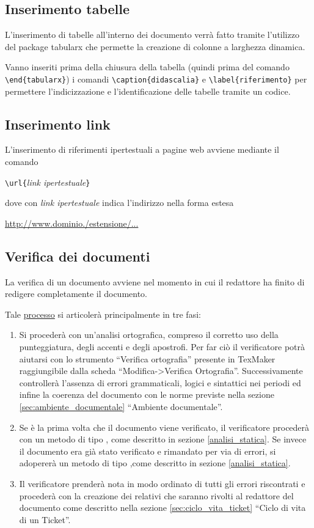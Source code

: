 \subsection{Inserimento tabelle}
L'inserimento di tabelle all'interno dei documento verrà fatto tramite l'utilizzo del package tabularx che permette la creazione di colonne a larghezza dinamica.

Vanno inseriti prima della chiusura della tabella (quindi prima del comando \verb+\end{tabularx}+) i comandi \verb+\caption{didascalia}+ e \verb+\label{riferimento}+ per permettere l'indicizzazione e l'identificazione delle tabelle tramite un codice.

\subsection{Inserimento link}
L'inserimento di riferimenti ipertestuali a pagine web avviene mediante il comando 
\begin{center}
\verb+\url{+\textit{link ipertestuale}\verb+}+
\end{center}
dove con \textit{link ipertestuale} indica l'indirizzo nella forma estesa 
\begin{center}
\url{http://www.dominio./estensione/...}
\end{center}


\subsection{Verifica dei documenti}
\label{sec:verifica_documenti}
La verifica di un documento avviene nel momento in cui il redattore ha finito di redigere completamente il documento.

Tale \underline{processo} si articolerà principalmente in tre fasi:
\begin{enumerate}
\item Si procederà con un'analisi ortografica, compreso il corretto uso della punteggiatura, degli accenti e degli apostrofi. Per far ciò il verificatore potrà aiutarsi con lo strumento ``Verifica ortografia'' presente in TexMaker raggiungibile dalla scheda ``Modifica->Verifica Ortografia''. Successivamente controllerà l'assenza di errori grammaticali, logici e sintattici nei periodi ed infine la coerenza del documento con le norme previste nella sezione \ref{sec:ambiente_documentale} ``Ambiente documentale''.
\item Se è la prima volta che il documento viene verificato, il verificatore procederà con un metodo di tipo , come descritto in sezione \ref{analisi_statica}. Se invece il documento era già stato verificato e rimandato per via di errori, si adopererà un metodo di tipo ,come descritto in sezione \ref{analisi_statica}.
\item Il verificatore prenderà nota in modo ordinato di tutti gli errori riscontrati e procederà con la creazione dei  relativi che saranno rivolti al redattore del documento come descritto nella sezione \ref{sec:ciclo_vita_ticket} ``Ciclo di vita di un Ticket''.
\end{enumerate}

